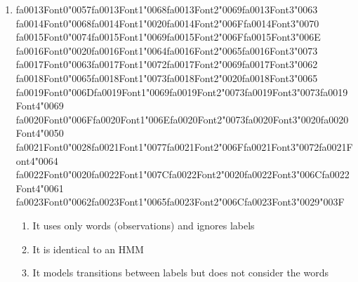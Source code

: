 \documentclass[12pt]{article}
\begin{document}
\begin{enumerate}[label=Q\arabic*.]
\begin{enumerate}[label=(\Alph*)]
    \item Inside an entity
    \item Outside any entity
    \item Between two tokens
\end{enumerate}
\item {\csname fa0013Font0\endcsname\char"0057}{\csname fa0013Font1\endcsname\char"0068}{\csname fa0013Font2\endcsname\char"0069}{\csname fa0013Font3\endcsname\char"0063} {\csname fa0014Font0\endcsname\char"0068}{\csname fa0014Font1\endcsname\char"0020}{\csname fa0014Font2\endcsname\char"006F}{\csname fa0014Font3\endcsname\char"0070} {\csname fa0015Font0\endcsname\char"0074}{\csname fa0015Font1\endcsname\char"0069}{\csname fa0015Font2\endcsname\char"006F}{\csname fa0015Font3\endcsname\char"006E} {\csname fa0016Font0\endcsname\char"0020}{\csname fa0016Font1\endcsname\char"0064}{\csname fa0016Font2\endcsname\char"0065}{\csname fa0016Font3\endcsname\char"0073} {\csname fa0017Font0\endcsname\char"0063}{\csname fa0017Font1\endcsname\char"0072}{\csname fa0017Font2\endcsname\char"0069}{\csname fa0017Font3\endcsname\char"0062} {\csname fa0018Font0\endcsname\char"0065}{\csname fa0018Font1\endcsname\char"0073}{\csname fa0018Font2\endcsname\char"0020}{\csname fa0018Font3\endcsname\char"0065} {\csname fa0019Font0\endcsname\char"006D}{\csname fa0019Font1\endcsname\char"0069}{\csname fa0019Font2\endcsname\char"0073}{\csname fa0019Font3\endcsname\char"0073}{\csname fa0019Font4\endcsname\char"0069} {\csname fa0020Font0\endcsname\char"006F}{\csname fa0020Font1\endcsname\char"006E}{\csname fa0020Font2\endcsname\char"0073}{\csname fa0020Font3\endcsname\char"0020}{\csname fa0020Font4\endcsname\char"0050} {\csname fa0021Font0\endcsname\char"0028}{\csname fa0021Font1\endcsname\char"0077}{\csname fa0021Font2\endcsname\char"006F}{\csname fa0021Font3\endcsname\char"0072}{\csname fa0021Font4\endcsname\char"0064} {\csname fa0022Font0\endcsname\char"0020}{\csname fa0022Font1\endcsname\char"007C}{\csname fa0022Font2\endcsname\char"0020}{\csname fa0022Font3\endcsname\char"006C}{\csname fa0022Font4\endcsname\char"0061} {\csname fa0023Font0\endcsname\char"0062}{\csname fa0023Font1\endcsname\char"0065}{\csname fa0023Font2\endcsname\char"006C}{\csname fa0023Font3\endcsname\char"0029}{\char"003F}
\begin{enumerate}[label=(\Alph*)]
    \item It uses only words (observations) and ignores labels
    \item It is identical to an HMM
    \item It models transitions between labels but does not consider the words

\end{enumerate}
\end{enumerate}
\end{document}
